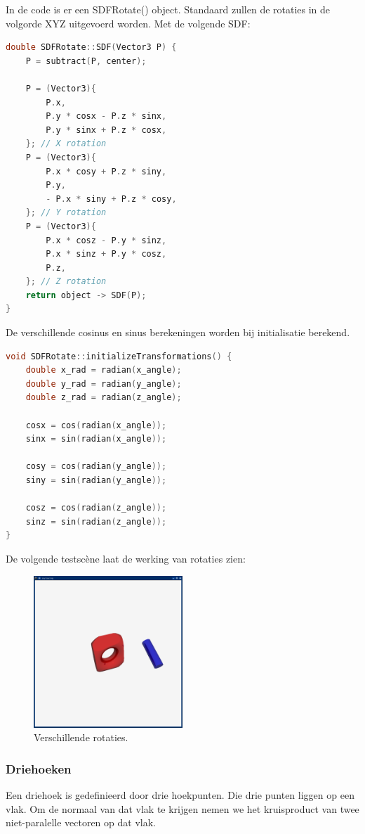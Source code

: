 \documentclass[12pt, a4paper]{article}
\begin{document}
In de code is er een SDFRotate() object. Standaard zullen de rotaties in de volgorde XYZ uitgevoerd worden. Met de volgende SDF:
\begin{lstlisting}[language=C++]
double SDFRotate::SDF(Vector3 P) {
    P = subtract(P, center);

    P = (Vector3){
        P.x,
        P.y * cosx - P.z * sinx,
        P.y * sinx + P.z * cosx,
    }; // X rotation
    P = (Vector3){
        P.x * cosy + P.z * siny,
        P.y,
        - P.x * siny + P.z * cosy,
    }; // Y rotation
    P = (Vector3){
        P.x * cosz - P.y * sinz,
        P.x * sinz + P.y * cosz,
        P.z,
    }; // Z rotation
    return object -> SDF(P);
}
\end{lstlisting}

De verschillende cosinus en sinus berekeningen worden bij initialisatie berekend.

\begin{lstlisting}[language=C++]
void SDFRotate::initializeTransformations() {
    double x_rad = radian(x_angle);
    double y_rad = radian(y_angle);
    double z_rad = radian(z_angle);

    cosx = cos(radian(x_angle));
    sinx = sin(radian(x_angle));

    cosy = cos(radian(y_angle));
    siny = sin(radian(y_angle));

    cosz = cos(radian(z_angle));
    sinz = sin(radian(z_angle));
}
\end{lstlisting}

De volgende testscène laat de werking van rotaties zien:

\begin{figure}[H]
    \centering
    \includegraphics[width=0.50\textwidth]{renders/rotaties.png}
    \caption{Verschillende rotaties.}
    \label{fig:rotaties}
\end{figure}
\subsubsection{Driehoeken}
Een driehoek is gedefinieerd door drie hoekpunten. Die drie punten liggen op een vlak. Om de normaal van dat vlak te krijgen nemen we het kruisproduct van twee niet-paralelle vectoren op dat vlak. 
\end{document}
